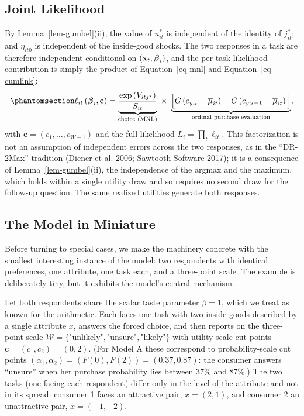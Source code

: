 \documentclass[
  letterpaper,
  DIV=11,
  numbers=noendperiod]{scrartcl}
\theoremstyle{plain}
\theoremstyle{plain}
\theoremstyle{remark}
\begin{document}
\subsection{Joint Likelihood}\label{joint-likelihood}

By Lemma~\ref{lem-gumbel}(ii), the value of \(u^*_{it}\) is independent
of the identity of \(j^*_{it}\); and \(\eta_{it0}\) is independent of
the inside-good shocks. The two responses in a task are therefore
independent conditional on \((\mathbf{x}_t, \boldsymbol{\beta}_i)\), and the per-task
likelihood contribution is simply the product of Equation~\ref{eq-mnl}
and Equation~\ref{eq-cumlink}:
\begin{equation}\protect\phantomsection\label{eq-joint}{
\ell_{it} \left( \bfbeta_i, \mathbf{c} \right)
= \underbrace{\frac{\exp \left( V_{itj^*} \right)}{S_{it}}}_{\text{choice (MNL)}}
\; \times \;
\underbrace{\Big[ G \left( c_{y_{it}} - \overline{\mu}_{it} \right) - G \left( c_{y_{it}-1} - \overline{\mu}_{it} \right) \Big]}_{\text{ordinal purchase evaluation}},
}\end{equation} with \(\mathbf{c} = (c_1, \ldots, c_{W-1})\) and the
full likelihood \(L_i = \prod_{t} \ell_{it}\). This factorization is not
an assumption of independent errors across the two responses, as in the
``DR-2Max'' tradition (Diener et al. 2006; Sawtooth Software 2017); it
is a consequence of Lemma~\ref{lem-gumbel}(ii), the independence of the
argmax and the maximum, which holds within a single utility draw and so
requires no second draw for the follow-up question. The same realized
utilities generate both responses.

\subsection{The Model in Miniature}\label{sec-toy}

Before turning to special cases, we make the machinery concrete with the
smallest interesting instance of the model: two respondents with
identical preferences, one attribute, one task each, and a three-point
scale. The example is deliberately tiny, but it exhibits the model's
central mechanism.

Let both respondents share the scalar taste parameter \(\beta = 1\),
which we treat as known for the arithmetic. Each faces one task with two
inside goods described by a single attribute \(x\), answers the forced
choice, and then reports on the three-point scale
\(\mathcal{W} = \lbrace \text{"unlikely"}, \text{"unsure"}, \text{"likely"} \rbrace\)
with utility-scale cut points \(\mathbf{c} = (c_1, c_2) = (0, 2)\). (For
Model A these correspond to probability-scale cut points
\(\left( \alpha_1, \alpha_2 \right) = \left( F(0), F(2) \right) = (0.37, 0.87)\):
the consumer answers ``unsure'' when her purchase probability lies
between 37\% and 87\%.) The two tasks (one facing each respondent)
differ only in the level of the attribute and not in its spread:
consumer 1 faces an attractive pair, \(x = (2, 1)\), and consumer 2 an
unattractive pair, \(x = (-1, -2)\).
\end{document}

